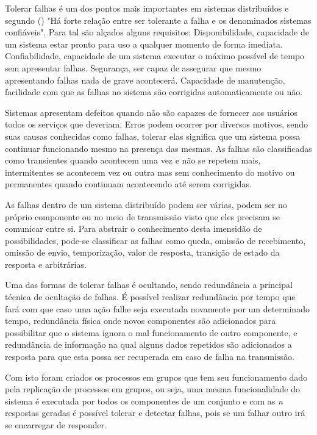 	Tolerar falhas é um dos pontos mais importantes em sistemas distribuídos e segundo  (\citeyear{Tanenbaum}) "Há forte relação entre ser tolerante a falha e os denominados sistemas confiáveis". Para tal são alçados alguns requisitos: Disponibilidade, capacidade de um sistema estar pronto para uso a qualquer momento de forma imediata. Confiabilidade, capacidade de um sistema executar o máximo possível de tempo sem apresentar falhas. Segurança, ser capaz de assegurar que mesmo apresentando falhas nada de grave acontecerá. Capacidade de manutenção, facilidade com que as falhas no sistema são corrigidas automaticamente ou não.
	
	Sistemas apresentam defeitos quando não são capazes de fornecer aos usuários todos os serviços que deveriam. Erros podem ocorrer por diversos motivos, sendo suas causas conhecidas como falhas, tolerar elas significa que um sistema possa continuar funcionando mesmo na presença das mesmas. As falhas são classificadas como transientes quando acontecem uma vez e não se repetem mais, intermitentes se acontecem vez ou outra mas sem conhecimento do motivo ou permanentes quando continuam acontecendo até serem corrigidas.
	
	As falhas dentro de um sistema distribuído podem ser várias, podem ser no próprio componente ou no meio de transmissão visto que eles precisam se comunicar entre si. Para abstrair o conhecimento desta imensidão de possibilidades, pode-se classificar as falhas como queda, omissão de recebimento, omissão de envio, temporização, valor de resposta, transição de estado da resposta e arbitrárias.
	
	Uma das formas de tolerar falhas é ocultando, sendo redundância a principal técnica de ocultação de falhas. É possível realizar redundância por tempo que fará com que caso uma ação falhe seja executada novamente por um determinado tempo, redundância física onde novos componentes são adicionados para possibilitar que o sistema ignora o mal funcionamento de outro componente, e redundância de informação na qual alguns dados repetidos são adicionados a resposta para que esta possa ser recuperada em caso de falha na transmissão.
	
	Com isto foram criados os processos em grupos que tem seu funcionamento dado pela replicação de processos em grupos, ou seja, uma mesma funcionalidade do sistema é executada por todos os componentes de um conjunto e com as \textit{n} respostas geradas é possível tolerar e detectar falhas, pois se um falhar outro irá se encarregar de responder.
	
